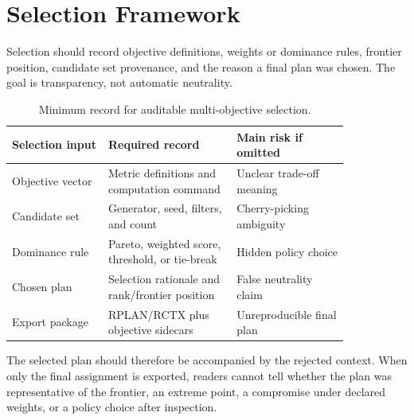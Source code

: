 \section{Selection Framework}

Selection should record objective definitions, weights or dominance rules,
frontier position, candidate set provenance, and the reason a final plan was
chosen. The goal is transparency, not automatic neutrality.

\begin{table}[htbp]
\centering
\small
\begin{tabular}{p{0.24\linewidth}p{0.32\linewidth}p{0.28\linewidth}}
\toprule
Selection input & Required record & Main risk if omitted \\
\midrule
Objective vector & Metric definitions and computation command & Unclear trade-off meaning \\
Candidate set & Generator, seed, filters, and count & Cherry-picking ambiguity \\
Dominance rule & Pareto, weighted score, threshold, or tie-break & Hidden policy choice \\
Chosen plan & Selection rationale and rank/frontier position & False neutrality claim \\
Export package & RPLAN/RCTX plus objective sidecars & Unreproducible final plan \\
\bottomrule
\end{tabular}
\caption{Minimum record for auditable multi-objective selection.}
\end{table}

The selected plan should therefore be accompanied by the rejected context. When
only the final assignment is exported, readers cannot tell whether the plan was
representative of the frontier, an extreme point, a compromise under declared
weights, or a policy choice after inspection.
